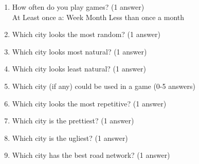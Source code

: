 	\begin{enumerate}
		\item How often do you play games? (1 answer)\\
		At Least once a:	\tab Week \tab Month \tab Less than once a month
		
		\item Which city looks the most random? (1 answer)\\
		    
		
		\item Which city looks most natural? (1 answer)\\
		    
		
		\item Which city looks least natural? (1 answer)\\
		    
		
		\item Which city (if any) could be used in a game (0-5 answers)\\
		    
		
		\item Which city looks the most repetitive? (1 answer)\\
		    
		
		\item Which city is the prettiest? (1 answer)\\
		    
		
		\item Which city is the ugliest? (1 answer)\\
		    
		
		\item Which city has the best road network? (1 answer)\\
		    
	\end{enumerate}
	
	
	
	